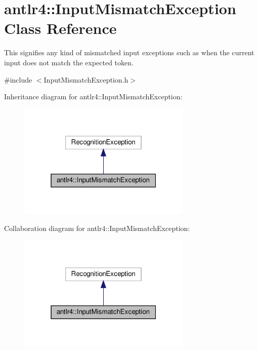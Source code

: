 \hypertarget{classantlr4_1_1InputMismatchException}{}\section{antlr4\+:\+:Input\+Mismatch\+Exception Class Reference}
\label{classantlr4_1_1InputMismatchException}


This signifies any kind of mismatched input exceptions such as when the current input does not match the expected token.  




{\ttfamily \#include $<$Input\+Mismatch\+Exception.\+h$>$}



Inheritance diagram for antlr4\+:\+:Input\+Mismatch\+Exception\+:
\nopagebreak
\begin{figure}[H]
\begin{center}
\leavevmode
\includegraphics[width=235pt]{classantlr4_1_1InputMismatchException__inherit__graph}
\end{center}
\end{figure}


Collaboration diagram for antlr4\+:\+:Input\+Mismatch\+Exception\+:
\nopagebreak
\begin{figure}[H]
\begin{center}
\leavevmode
\includegraphics[width=235pt]{classantlr4_1_1InputMismatchException__coll__graph}
\end{center}
\end{figure}

